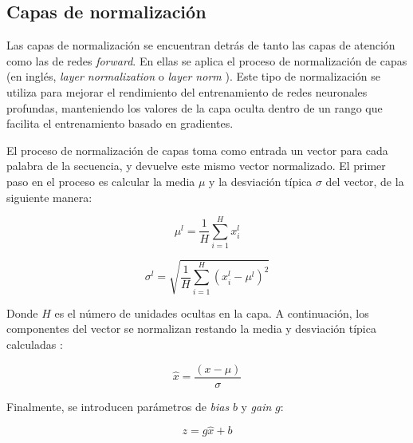 \documentclass[11pt,spanish,listoffigures,listoftables]{tfgetsinf}
\begin{document}
\subsection{Capas de normalización}

Las capas de normalización se encuentran detrás de tanto las capas de atención como las de redes \textit{forward}. En ellas se aplica el proceso de normalización de capas (en inglés, \textit{layer normalization} o \textit{layer norm} \cite{ba2016layernormalization}). Este tipo de normalización se utiliza para mejorar el rendimiento del entrenamiento de redes neuronales profundas, manteniendo los valores de la capa oculta dentro de un rango que facilita el entrenamiento basado en gradientes.

El proceso de normalización de capas toma como entrada un vector para cada palabra de la secuencia, y devuelve este mismo vector normalizado. El primer paso en el proceso es calcular la media $\mu$ y la desviación típica $\sigma$ del vector, de la siguiente manera:

\begin{equation}
\mu^l = \frac{1}{H} \sum_{i = 1}^Hx_i^l
\end{equation}

\begin{equation}
\sigma^l = \sqrt{\frac{1}{H} \sum_{i = 1}^H (x_i^l - \mu^l)^2}
\end{equation}

Donde $H$ es el número de unidades ocultas en la capa. A continuación, los componentes del vector se normalizan restando la media y desviación típica calculadas \cite{jurafsky2023speech}:

\begin{equation}
\hat{x} = \frac{(x - \mu)}{\sigma}
\end{equation}

Finalmente, se introducen parámetros de \textit{bias} $b$ y \textit{gain} $g$:

\begin{equation}
z = g\hat{x} + b
\end{equation}


\end{document}
